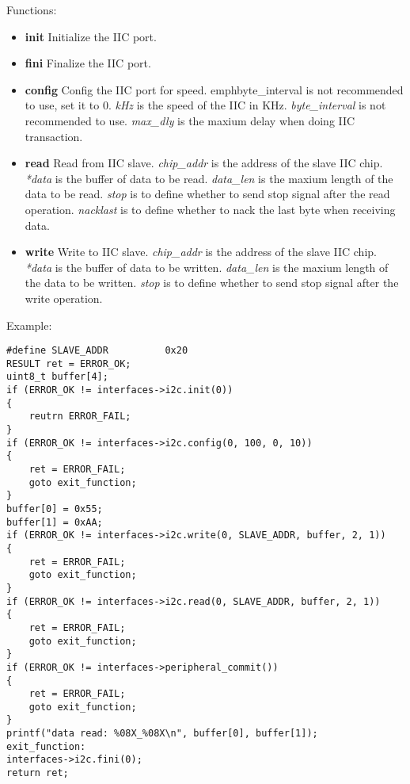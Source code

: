 \documentclass[a4paper,12pt]{book}
\begin{document}
\vspace{6pt}
Functions:
\begin{itemize}
\item \textbf{init}
Initialize the IIC port.
\item \textbf{fini}
Finalize the IIC port.
\item \textbf{config}
Config the IIC port for speed. emph{byte\_interval} is not recommended to use, set it to 0.
\newline\emph{kHz} is the speed of the IIC in KHz.
\newline\emph{byte\_interval} is not recommended to use.
\newline\emph{max\_dly} is the maxium delay when doing IIC transaction.
\item \textbf{read}
Read from IIC slave.
\newline\emph{chip\_addr} is the address of the slave IIC chip.
\newline\emph{*data} is the buffer of data to be read.
\newline\emph{data\_len} is the maxium length of the data to be read.
\newline\emph{stop} is to define whether to send stop signal after the read operation.
\newline\emph{nacklast} is to define whether to nack the last byte when receiving data.
\item \textbf{write}
Write to IIC slave.
\newline\emph{chip\_addr} is the address of the slave IIC chip.
\newline\emph{*data} is the buffer of data to be written.
\newline\emph{data\_len} is the maxium length of the data to be written.
\newline\emph{stop} is to define whether to send stop signal after the write operation.
\end{itemize}

\vspace{6pt}
Example:
\begin{lstlisting}
#define SLAVE_ADDR			0x20
RESULT ret = ERROR_OK;
uint8_t buffer[4];
if (ERROR_OK != interfaces->i2c.init(0))
{
	reutrn ERROR_FAIL;
}
if (ERROR_OK != interfaces->i2c.config(0, 100, 0, 10))
{
	ret = ERROR_FAIL;
	goto exit_function;
}
buffer[0] = 0x55;
buffer[1] = 0xAA;
if (ERROR_OK != interfaces->i2c.write(0, SLAVE_ADDR, buffer, 2, 1))
{
	ret = ERROR_FAIL;
	goto exit_function;
}
if (ERROR_OK != interfaces->i2c.read(0, SLAVE_ADDR, buffer, 2, 1))
{
	ret = ERROR_FAIL;
	goto exit_function;
}
if (ERROR_OK != interfaces->peripheral_commit())
{
	ret = ERROR_FAIL;
	goto exit_function;
}
printf("data read: %08X_%08X\n", buffer[0], buffer[1]);
exit_function:
interfaces->i2c.fini(0);
return ret;
\end{lstlisting}
\end{document}
